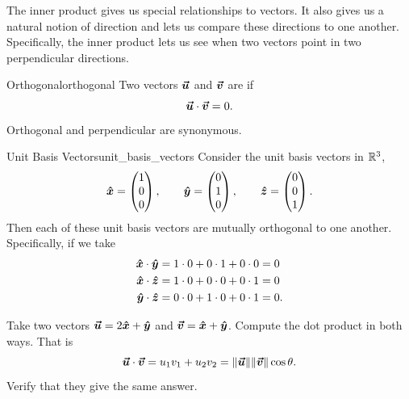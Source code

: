         The inner product gives us special relationships to vectors. It also gives us a natural notion of direction and lets us compare these directions to one another.  Specifically, the inner product lets us see when two vectors point in two perpendicular directions. 
        
        \begin{df}{Orthogonal}{orthogonal}
        Two vectors $\boldsymbol{\boldsymbol{\vec{u}}}$ and $\boldsymbol{\boldsymbol{\vec{v}}}$ are   if
        \[
        \boldsymbol{\boldsymbol{\vec{u}}}\cdot \boldsymbol{\boldsymbol{\vec{v}}}=0.
        \]
        Orthogonal and perpendicular are synonymous.
        \end{df}
        
        \begin{ex}{Unit Basis Vectors}{unit_basis_vectors}
            Consider the unit basis vectors in $\mathbb{R}^3$,
            \[
            \boldsymbol{\hat{x}} = \begin{pmatrix} 1 \\ 0 \\ 0 \end{pmatrix}, \qquad \boldsymbol{\hat{y}} = \begin{pmatrix} 0 \\ 1 \\ 0 \end{pmatrix}, \qquad \boldsymbol{\hat{z}} = \begin{pmatrix} 0 \\ 0 \\ 1 \end{pmatrix}.
            \]
            Then each of these unit basis vectors are mutually orthogonal to one another.  Specifically, if we take
            \begin{align*}
            \boldsymbol{\hat{x}} \cdot \boldsymbol{\hat{y}} &= 1\cdot 0 + 0 \cdot 1 + 0 \cdot 0 = 0\\
            \boldsymbol{\hat{x}} \cdot \boldsymbol{\hat{z}} &= 1\cdot 0 + 0 \cdot 0 + 0 \cdot 1 = 0\\
            \boldsymbol{\hat{y}} \cdot \boldsymbol{\hat{z}} &= 0 \cdot 0 + 1\cdot 0 + 0 \cdot 1 = 0.
            \end{align*}
        \end{ex}
        
        \begin{exercise}
        Take two vectors $\boldsymbol{\boldsymbol{\vec{u}}}=2\boldsymbol{\hat{x}} + \boldsymbol{\hat{y}}$ and $\boldsymbol{\boldsymbol{\vec{v}}}=\boldsymbol{\hat{x}} + \boldsymbol{\hat{y}}$.  Compute the dot product in both ways.  That is
        \[
        \boldsymbol{\boldsymbol{\vec{u}}}\cdot \boldsymbol{\boldsymbol{\vec{v}}}=u_1v_1 + u_2 v_2=\|\boldsymbol{\boldsymbol{\vec{u}}}\|\|\boldsymbol{\boldsymbol{\vec{v}}}\|\cos \theta.
        \]
        Verify that they give the same answer.
        \end{exercise}
        
